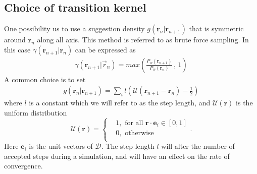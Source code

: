 \documentclass[a4paper,10pt,twocolumn]{article} %
\newcommand{\ts}[1]{\textbf{#1}}
\begin{document}

\subsection{Choice of transition kernel} %

%
One possibility us to use a suggestion density $g(\ts r_n|\ts r_{n+1})$ that is symmetric around $\ts r_n$ along all axis. 
This method is referred to as brute force sampling.
In this case $\gamma(\ts r_{n+1}|\ts r_{n})$ can be expressed as
\begin{align} 
	\gamma(\ts r_{n+1}|\vec r_n)=max\left(
	\frac
	{P_w(\ts r_{n+1})}
    {P_w(\ts r_n)}\, 
	,\, 1 \right) \label{gamma_bruteforce}
\end{align}
A common choice is to set
\begin{align}
	g(\ts r_n|\ts r_{n+1}) = \sum_i l\left(\mathcal U(\ts r_{n+1}-\ts r_n) - \frac12\right)
	\label{sugdebf}
\end{align}
where $l$ is a constant which we will refer to as the step length, and $\mathcal U(\ts r)$ is the uniform distribution
\begin{equation}
	\mathcal U(\ts r) = \left\{ 
	\begin{split} 
		&1, \text{ for all } \ts r \cdot \ts e_i \in [0,1]\\
		&0, \text{ otherwise }\\
	\end{split}
	\right..
\end{equation} 
Here $\ts e_i$ is the unit vectors of $\mathcal D$. 
The step length $l$ will alter the number of 
accepted steps during a simulation, and will have an effect on the rate of convergence. %
\end{document}
